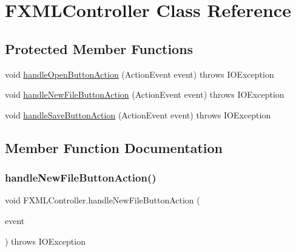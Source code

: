 \hypertarget{class_f_x_m_l_controller}{}\section{F\+X\+M\+L\+Controller Class Reference}
\label{class_f_x_m_l_controller}
\subsection*{Protected Member Functions}
\begin{DoxyCompactItemize}
\item 
void \mbox{\hyperlink{class_f_x_m_l_controller_a9732d827f72b5b6551fbbe7c83e78a0a}{handle\+Open\+Button\+Action}} (Action\+Event event)  throws I\+O\+Exception 
\item 
void \mbox{\hyperlink{class_f_x_m_l_controller_a0b6a0b19e43428486d024f3927ed369e}{handle\+New\+File\+Button\+Action}} (Action\+Event event)  throws I\+O\+Exception 
\item 
void \mbox{\hyperlink{class_f_x_m_l_controller_a533446d86df0c4a1db758543d175c357}{handle\+Save\+Button\+Action}} (Action\+Event event)  throws I\+O\+Exception 
\end{DoxyCompactItemize}


\subsection{Member Function Documentation}
\mbox{\label{class_f_x_m_l_controller_a0b6a0b19e43428486d024f3927ed369e}} 
\subsubsection{\texorpdfstring{handle\+New\+File\+Button\+Action()}{handleNewFileButtonAction()}}
{\footnotesize\ttfamily void F\+X\+M\+L\+Controller.\+handle\+New\+File\+Button\+Action (\begin{DoxyParamCaption}\item[{Action\+Event}]{event }\end{DoxyParamCaption}) throws I\+O\+Exception\hspace{0.3cm}{\ttfamily [protected]}}

